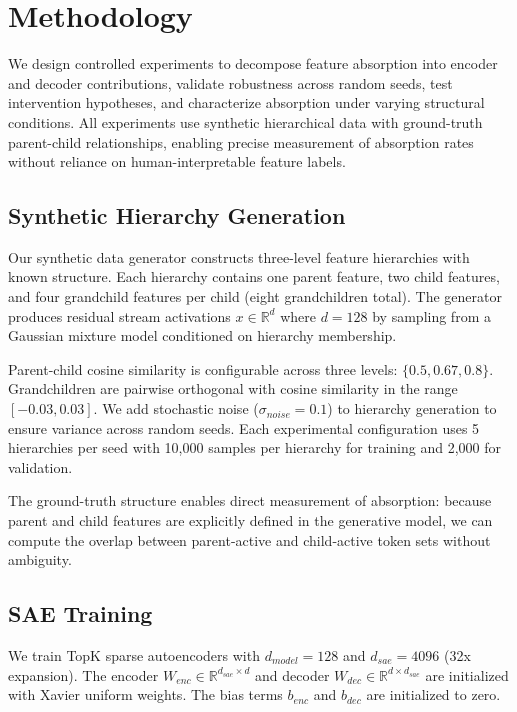 \documentclass{article}
\begin{document}
\section{Methodology}

We design controlled experiments to decompose feature absorption into encoder and decoder contributions, validate robustness across random seeds, test intervention hypotheses, and characterize absorption under varying structural conditions. All experiments use synthetic hierarchical data with ground-truth parent-child relationships, enabling precise measurement of absorption rates without reliance on human-interpretable feature labels.

\subsection{Synthetic Hierarchy Generation}

Our synthetic data generator constructs three-level feature hierarchies with known structure. Each hierarchy contains one parent feature, two child features, and four grandchild features per child (eight grandchildren total). The generator produces residual stream activations $x \in \mathbb{R}^d$ where $d = 128$ by sampling from a Gaussian mixture model conditioned on hierarchy membership.

Parent-child cosine similarity is configurable across three levels: $\{0.5, 0.67, 0.8\}$. Grandchildren are pairwise orthogonal with cosine similarity in the range $[-0.03, 0.03]$. We add stochastic noise ($\sigma_{noise} = 0.1$) to hierarchy generation to ensure variance across random seeds. Each experimental configuration uses 5 hierarchies per seed with 10,000 samples per hierarchy for training and 2,000 for validation.

The ground-truth structure enables direct measurement of absorption: because parent and child features are explicitly defined in the generative model, we can compute the overlap between parent-active and child-active token sets without ambiguity.

\subsection{SAE Training}

We train TopK sparse autoencoders with $d_{model} = 128$ and $d_{sae} = 4096$ (32x expansion). The encoder $W_{enc} \in \mathbb{R}^{d_{sae} \times d}$ and decoder $W_{dec} \in \mathbb{R}^{d \times d_{sae}}$ are initialized with Xavier uniform weights. The bias terms $b_{enc}$ and $b_{dec}$ are initialized to zero.
\end{document}
